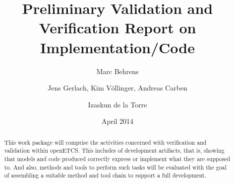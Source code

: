 \documentclass{template/openetcs_report}
\numberwithin{figure}{chapter}
\numberwithin{table}{chapter}
\begin{document}
\frontmatter
{}




\title{Preliminary Validation and Verification Report on Implementation/Code}


\date{April 2014}


\author{Marc Behrens}

 
\author{Jens Gerlach, Kim Völlinger, Andreas Carben}


\author{Izaskun de la Torre}




\begin{abstract}
  This work package will comprise the activities concerned with
  verification and validation within openETCS. This includes \vv of
  development artifacts, that is, showing that models and code
  produced correctly express or implement what they are supposed
  to. And also, methods and tools to perform such tasks will be
  evaluated with the goal of assembling a suitable method and tool
  chain to support a full development.
\end{abstract}

\maketitle
\tableofcontents
\listoffiguresandtables
\clearpage
{}
\cleardoublepage




\cleardoublepage
\cleardoublepage
\cleardoublepage
\cleardoublepage
\cleardoublepage





\nocite{*}
\end{document}

